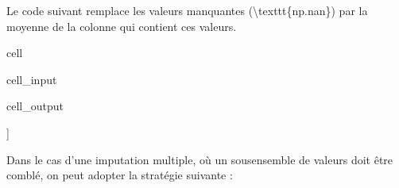 \documentclass[letterpaper,10pt,french]{sphinxmanual}
\begin{document}
\sphinxAtStartPar
Le code suivant remplace les valeurs manquantes (\textbackslash{}texttt\{np.nan\}) par la moyenne de la colonne qui contient ces valeurs.

\begin{sphinxuseclass}{cell}
\begin{sphinxuseclass}{cell_input}
\begin{sphinxVerbatim}[commandchars=\\\{\}]
   
   
   
  \PYG{p}{[}\PYG{p}{[} \PYG{p}{]} \PYG{p}{[} \PYG{p}{]} \PYG{p}{[} \PYG{p}{]}\PYG{p}{]}
\end{sphinxVerbatim}

\end{sphinxuseclass}
\begin{sphinxuseclass}{cell_output}
\begin{sphinxVerbatim}[commandchars=\\\{\}]
[[1.  2. ]
 [2.5 3. ]
 [4.  5. ]]
\end{sphinxVerbatim}

\end{sphinxuseclass}
\end{sphinxuseclass}
\sphinxAtStartPar
Dans le cas d’une imputation multiple, où un sous\sphinxhyphen{}ensemble de valeurs doit être comblé, on peut adopter la stratégie suivante :
\end{document}
